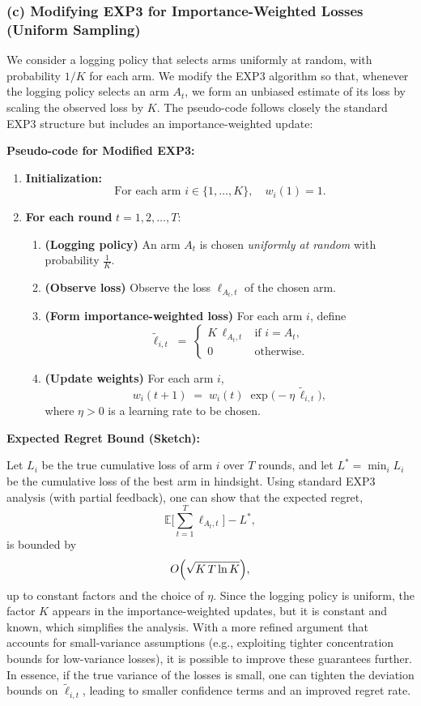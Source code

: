 \bigskip
\noindent
\subsubsection*{(c) Modifying EXP3 for Importance-Weighted Losses (Uniform Sampling)}

We consider a logging policy that selects arms uniformly at random, 
with probability $1/K$ for each arm. 
We modify the EXP3 algorithm so that, whenever the logging policy selects an arm $A_t$, 
we form an unbiased estimate of its loss by scaling the observed loss by $K$. 
The pseudo-code follows closely the standard EXP3 structure but includes an importance-weighted update:

\bigskip
\noindent
\textbf{Pseudo-code for Modified EXP3:}

\begin{enumerate}
    \item \textbf{Initialization:} 
    \[
        \text{For each arm } i \in \{1,\dots,K\},\quad w_i(1) = 1.
    \]
    \item \textbf{For each round } $t = 1,2,\dots,T$:
    \begin{enumerate}
        \item \textbf{(Logging policy)} An arm $A_t$ is chosen \emph{uniformly at random} with probability $\frac{1}{K}$.
        \item \textbf{(Observe loss)} Observe the loss $\ell_{A_t,t}$ of the chosen arm.
        \item \textbf{(Form importance-weighted loss)} For each arm $i$, define
        \[
            \tilde{\ell}_{i,t} \;=\;
            \begin{cases}
            K \,\ell_{A_t,t} & \text{if } i = A_t, \\
            0 & \text{otherwise}.
            \end{cases}
        \]
        \item \textbf{(Update weights)} For each arm $i$,
        \[
            w_i(t+1) \;=\; w_i(t) \;\exp\bigl(-\eta\,\tilde{\ell}_{i,t}\bigr),
        \]
        where $\eta > 0$ is a learning rate to be chosen.
    \end{enumerate}
\end{enumerate}

\bigskip
\noindent
\textbf{Expected Regret Bound (Sketch):} 

Let $L_i$ be the true cumulative loss of arm $i$ over $T$ rounds, and let $L^* = \min_i L_i$ be the cumulative loss of the best arm in hindsight. 
Using standard EXP3 analysis (with partial feedback), one can show that the expected regret, 
\[
    \mathbb{E}\bigl[\sum_{t=1}^T \ell_{A_t,t}\bigr] - L^*,
\]
is bounded by 
\[
    O\Bigl(\sqrt{K\,T \ln K}\Bigr),
\]
up to constant factors and the choice of $\eta$. 
Since the logging policy is uniform, the factor $K$ appears in the importance-weighted updates, 
but it is constant and known, which simplifies the analysis. 
With a more refined argument that accounts for small-variance assumptions (e.g., exploiting tighter concentration bounds for low-variance losses), 
it is possible to improve these guarantees further. 
In essence, if the true variance of the losses is small, one can tighten the deviation bounds on $\tilde{\ell}_{i,t}$, 
leading to smaller confidence terms and an improved regret rate.